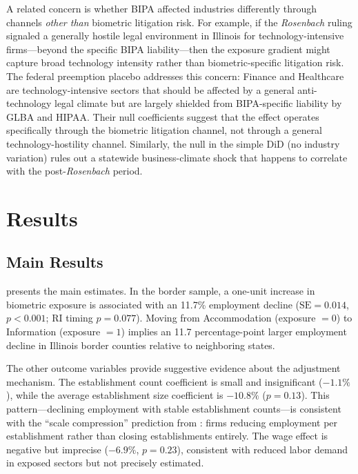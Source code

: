 \documentclass[12pt]{article}
\begin{document}
A related concern is whether BIPA affected industries differently through channels \textit{other than} biometric litigation risk. For example, if the \textit{Rosenbach} ruling signaled a generally hostile legal environment in Illinois for technology-intensive firms---beyond the specific BIPA liability---then the exposure gradient might capture broad technology intensity rather than biometric-specific litigation risk. The federal preemption placebo addresses this concern: Finance and Healthcare are technology-intensive sectors that should be affected by a general anti-technology legal climate but are largely shielded from BIPA-specific liability by GLBA and HIPAA. Their null coefficients suggest that the effect operates specifically through the biometric litigation channel, not through a general technology-hostility channel. Similarly, the null in the simple DiD (no industry variation) rules out a statewide business-climate shock that happens to correlate with the post-\textit{Rosenbach} period.

\section{Results}
\label{sec:results}

\subsection{Main Results}

 presents the main estimates. In the border sample, a one-unit increase in biometric exposure is associated with an 11.7\% employment decline ($\text{SE} = 0.014$, $p < 0.001$; RI timing $p = 0.077$). Moving from Accommodation (exposure $= 0$) to Information (exposure $= 1$) implies an 11.7 percentage-point larger employment decline in Illinois border counties relative to neighboring states.

The other outcome variables provide suggestive evidence about the adjustment mechanism. The establishment count coefficient is small and insignificant ($-1.1\%$), while the average establishment size coefficient is $-10.8\%$ ($p = 0.13$). This pattern---declining employment with stable establishment counts---is consistent with the ``scale compression'' prediction from : firms reducing employment per establishment rather than closing establishments entirely. The wage effect is negative but imprecise ($-6.9\%$, $p = 0.23$), consistent with reduced labor demand in exposed sectors but not precisely estimated.
\end{document}
